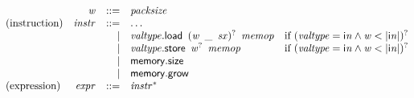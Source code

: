 $$\begin{array}{@{}lrrl@{}l@{}}
& {\mathit{w}} &::=& {\mathit{packsize}} \\
\mbox{(instruction)} & {\mathit{instr}} &::=& \dots \\ &&|&
{\mathit{valtype}}.\mathsf{load}~\,{({\mathit{w}}~\,\mathsf{\_}~\,{\mathit{sx}})^?}~\,{\mathit{memop}} &\quad
  \mbox{if}~({\mathit{valtype}} = {\mathsf{i}}{{\mathit{n}}} \land {\mathit{w}} < {|{\mathsf{i}}{{\mathit{n}}}|})^? \\ &&|&
{\mathit{valtype}}.\mathsf{store}~\,{{\mathit{w}}^?}~\,{\mathit{memop}} &\quad
  \mbox{if}~({\mathit{valtype}} = {\mathsf{i}}{{\mathit{n}}} \land {\mathit{w}} < {|{\mathsf{i}}{{\mathit{n}}}|})^? \\ &&|&
\mathsf{memory.size} \\ &&|&
\mathsf{memory.grow} \\
\mbox{(expression)} & {\mathit{expr}} &::=& {{\mathit{instr}}^\ast} \\
\end{array}
$$

\vspace{1ex}

